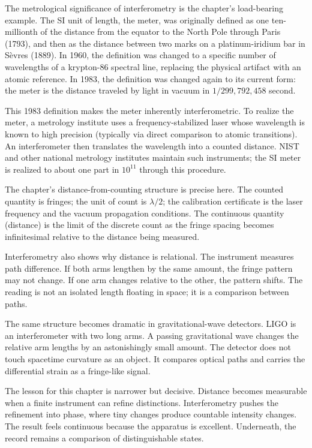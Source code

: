 The metrological significance of interferometry is the chapter's
load-bearing example. The SI unit of length, the meter, was originally
defined as one ten-millionth of the distance from the equator to the
North Pole through Paris (1793), and then as the distance between two
marks on a platinum-iridium bar in S\`evres (1889). In 1960, the
definition was changed to a specific number of wavelengths of a
krypton-86 spectral line, replacing the physical artifact with an atomic
reference. In 1983, the definition was changed again to its current form:
the meter is the distance traveled by light in vacuum in
$1/299{,}792{,}458$ second.

This 1983 definition makes the meter inherently interferometric. To
realize the meter, a metrology institute uses a frequency-stabilized
laser whose wavelength is known to high precision (typically via direct
comparison to atomic transitions). An interferometer then translates
the wavelength into a counted distance. NIST and other national
metrology institutes maintain such instruments; the SI meter is
realized to about one part in $10^{11}$ through this procedure.

The chapter's distance-from-counting structure is precise here. The counted
quantity is fringes; the unit of count is $\lambda/2$; the calibration
certificate is the laser frequency and the vacuum propagation conditions.
The continuous quantity (distance) is the limit of the discrete count as the
fringe spacing becomes infinitesimal relative to the distance being measured.

Interferometry also shows why distance is relational. The instrument measures
path difference. If both arms lengthen by the same amount, the fringe pattern
may not change. If one arm changes relative to the other, the pattern shifts.
The reading is not an isolated length floating in space; it is a comparison
between paths.

The same structure becomes dramatic in gravitational-wave detectors. LIGO is an
interferometer with two long arms. A passing gravitational wave changes the
relative arm lengths by an astonishingly small amount. The detector does not
touch spacetime curvature as an object. It compares optical paths and carries
the differential strain as a fringe-like signal.

The lesson for this chapter is narrower but decisive. Distance becomes
measurable when a finite instrument can refine distinctions. Interferometry
pushes the refinement into phase, where tiny changes produce countable
intensity changes. The result feels continuous because the apparatus is
excellent. Underneath, the record remains a comparison of distinguishable
states.


